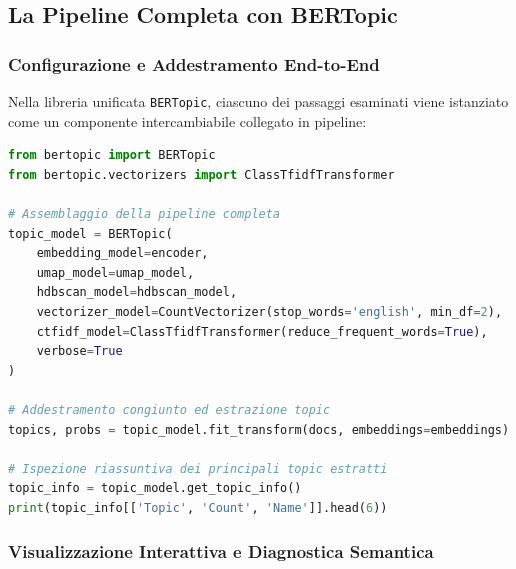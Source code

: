 \FloatBarrier
\subsection{La Pipeline Completa con BERTopic}
\label{sec:lab-bertopic-pipeline}

\FloatBarrier
\subsubsection{Configurazione e Addestramento End-to-End}
\label{subsec:lab-bertopic-training}

Nella libreria unificata \texttt{BERTopic}, ciascuno dei passaggi esaminati viene istanziato come un componente intercambiabile collegato in pipeline:

\begin{lstlisting}[language=Python, caption={Inizializzazione ed esecuzione della pipeline modulare BERTopic.}]
from bertopic import BERTopic
from bertopic.vectorizers import ClassTfidfTransformer

# Assemblaggio della pipeline completa
topic_model = BERTopic(
    embedding_model=encoder,
    umap_model=umap_model,
    hdbscan_model=hdbscan_model,
    vectorizer_model=CountVectorizer(stop_words='english', min_df=2),
    ctfidf_model=ClassTfidfTransformer(reduce_frequent_words=True),
    verbose=True
)

# Addestramento congiunto ed estrazione topic
topics, probs = topic_model.fit_transform(docs, embeddings=embeddings)

# Ispezione riassuntiva dei principali topic estratti
topic_info = topic_model.get_topic_info()
print(topic_info[['Topic', 'Count', 'Name']].head(6))
\end{lstlisting}

\FloatBarrier
\subsubsection{Visualizzazione Interattiva e Diagnostica Semantica}
\label{subsec:lab-visualizations}

